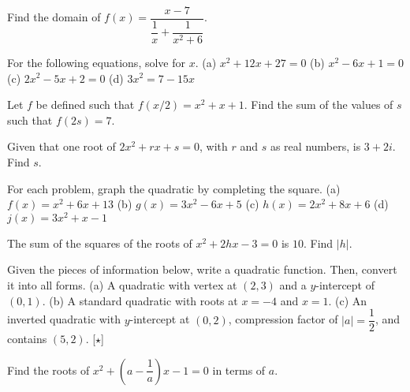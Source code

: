 \documentclass[../book.tex]{subfiles}
\begin{document}
\begin{reviewset}
\item Find the domain of $f(x)=\dfrac{x-7}{\dfrac{1}{x}+\dfrac{1}{x^2+6}}.$ \vspace{2mm}
\item For the following equations, solve for $x$.  \newline
(a) $x^2+12x+27=0$ \hspace{48mm} (b) $x^2-6x+1=0$ \newline 
(c) $2x^2-5x+2=0$ \hspace{50mm} (d) $3x^2=7-15x$ \vspace{2mm}
\item Let $f$ be defined such that $f(x/2)=x^2+x+1$.  Find the sum of the values of $s$ such that $f(2s)=7$.  \vspace{2mm}
\item Given that one root of $2x^2+rx+s=0$, with $r$ and $s$ as real numbers, is $3+2i$.  Find $s$.  \vspace{2mm}
\item For each problem, graph the quadratic by completing the square.  \newline 
(a) $f(x)=x^2+6x+13$ \hspace{49mm}
(b) $g(x)=3x^2-6x+5$ \newline
(c) $h(x)=2x^2+8x+6$ \hspace{49mm}
(d) $j(x)=3x^2+x-1$ \vspace{2mm}
\item The sum of the squares of the roots of $x^2+2hx-3=0$ is $10$.  Find $|h|$.  \vspace{2mm}
\item Given the pieces of information below, write a quadratic function.  Then, convert it into all forms.  \newline 
(a) A quadratic with vertex at $(2,3)$ and a $y$-intercept of $(0,1)$.  \newline 
(b) A standard quadratic with roots at $x=-4$ and $x=1$.  \newline
(c) An inverted quadratic with $y$-intercept at $(0,2)$, compression factor of $|a|=\dfrac{1}{2}$, and contains $(5,2)$.  [$\star$] \vspace{2mm}
\item Find the roots of $x^2+\left(a-\dfrac{1}{a}\right)x-1=0$ in terms of $a$.  \vspace{2mm}
\end{reviewset}
\end{document}
